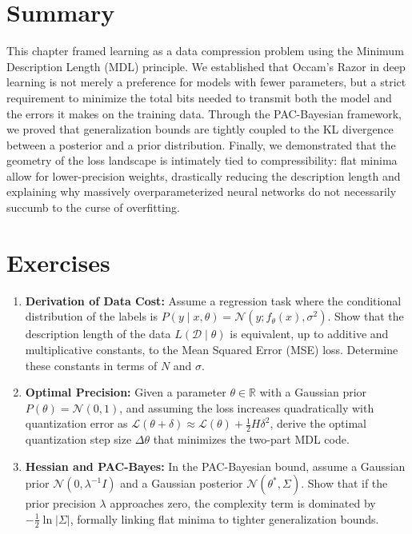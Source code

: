 \section{Summary}

This chapter framed learning as a data compression problem using the Minimum Description Length (MDL) principle. We established that Occam's Razor in deep learning is not merely a preference for models with fewer parameters, but a strict requirement to minimize the total bits needed to transmit both the model and the errors it makes on the training data. Through the PAC-Bayesian framework, we proved that generalization bounds are tightly coupled to the KL divergence between a posterior and a prior distribution. Finally, we demonstrated that the geometry of the loss landscape is intimately tied to compressibility: flat minima allow for lower-precision weights, drastically reducing the description length and explaining why massively overparameterized neural networks do not necessarily succumb to the curse of overfitting.

\section{Exercises}

\begin{enumerate}
    \item \textbf{Derivation of Data Cost:} Assume a regression task where the conditional distribution of the labels is $P(y \mid x, \theta) = \mathcal{N}(y; f_\theta(x), \sigma^2)$. Show that the description length of the data $L(\mathcal{D} \mid \theta)$ is equivalent, up to additive and multiplicative constants, to the Mean Squared Error (MSE) loss. Determine these constants in terms of $N$ and $\sigma$.
    \item \textbf{Optimal Precision:} Given a parameter $\theta \in \mathbb{R}$ with a Gaussian prior $P(\theta) = \mathcal{N}(0, 1)$, and assuming the loss increases quadratically with quantization error as $\mathcal{L}(\theta + \delta) \approx \mathcal{L}(\theta) + \frac{1}{2} H \delta^2$, derive the optimal quantization step size $\Delta \theta$ that minimizes the two-part MDL code.
    \item \textbf{Hessian and PAC-Bayes:} In the PAC-Bayesian bound, assume a Gaussian prior $\mathcal{N}(0, \lambda^{-1} I)$ and a Gaussian posterior $\mathcal{N}(\theta^*, \Sigma)$. Show that if the prior precision $\lambda$ approaches zero, the complexity term is dominated by $-\frac{1}{2}\ln|\Sigma|$, formally linking flat minima to tighter generalization bounds.
\end{enumerate}

